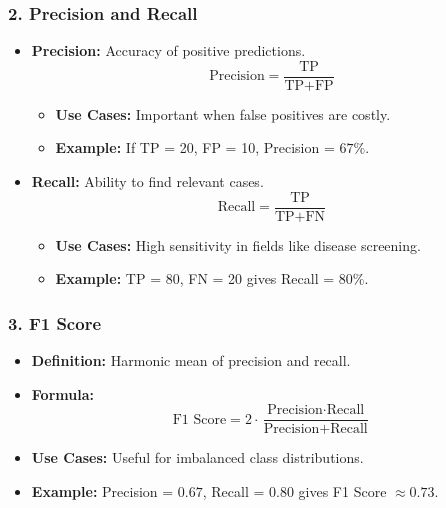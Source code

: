 \documentclass{beamer}
\begin{document}
\begin{frame}[fragile]
    \frametitle{2. Precision and Recall}
    \begin{itemize}
        \item \textbf{Precision:} Accuracy of positive predictions.
            \begin{equation}
            \text{Precision} = \frac{\text{TP}}{\text{TP} + \text{FP}}
            \end{equation}
            \begin{itemize}
                \item \textbf{Use Cases:} Important when false positives are costly.
                \item \textbf{Example:} 
                If TP = 20, FP = 10, Precision = \(67\%\).
            \end{itemize}

        \item \textbf{Recall:} Ability to find relevant cases.
            \begin{equation}
            \text{Recall} = \frac{\text{TP}}{\text{TP} + \text{FN}}
            \end{equation}
            \begin{itemize}
                \item \textbf{Use Cases:} High sensitivity in fields like disease screening.
                \item \textbf{Example:} 
                TP = 80, FN = 20 gives Recall = \(80\%\).
            \end{itemize}
    \end{itemize}
\end{frame}

\begin{frame}[fragile]
    \frametitle{3. F1 Score}
    \begin{itemize}
        \item \textbf{Definition:} Harmonic mean of precision and recall.
        \item \textbf{Formula:} 
        \begin{equation}
        \text{F1 Score} = 2 \cdot \frac{\text{Precision} \cdot \text{Recall}}{\text{Precision} + \text{Recall}}
        \end{equation}
        \item \textbf{Use Cases:} Useful for imbalanced class distributions.
        \item \textbf{Example:} 
        Precision = \(0.67\), Recall = \(0.80\) gives F1 Score \( \approx 0.73\).
    \end{itemize}
\end{frame}
\end{document}
